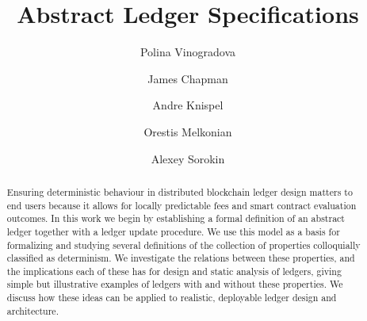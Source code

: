 \documentclass[runningheads]{llncs}
\newcommand{\UTXOma}{UTXO$_{\textsf{ma}}$}
\begin{document}
\lstset{
  basicstyle=\ttfamily,
  columns=fullflexible,
  keepspaces=true,
}

\title{Abstract Ledger Specifications}


\author{
  Polina Vinogradova
  \and James	Chapman
  \and Andre	Knispel
  \and Orestis	Melkonian
  \and Alexey Sorokin
}


\institute{
  IOG,
  \email{firstname.lastname@iohk.io}
  \and
  University of Edinburgh,
  \email{orestis.melkonian@ed.ac.uk} %
}

\maketitle


\begin{abstract}

Ensuring deterministic behaviour in distributed blockchain ledger design matters to end users because
it allows for locally predictable fees and smart contract evaluation outcomes.
In this work we begin by establishing a formal definition of an abstract ledger together with
a ledger update procedure. We use this model as a basis for formalizing and studying
several definitions of the collection of properties colloquially classified as
determinism. We investigate the relations between these properties, and the implications
each of these has for design and static analysis of ledgers, giving simple but
illustrative examples of ledgers with and without these properties.
We discuss how these ideas can be applied to realistic, deployable ledger
design and architecture.



\end{abstract}







%
%
%
%



\end{document}
